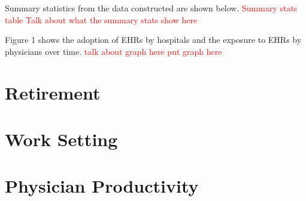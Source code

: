 \documentclass[11pt]{article}
\begin{document}
Summary statistics from the data constructed are shown below. \textcolor{red}{Summary stats table} \textcolor{red}{Talk about what the summary stats show here}

Figure 1 shows the adoption of EHRs by hospitals and the exposure to EHRs by physicians over time. \textcolor{red}{talk about graph here} \textcolor{red}{put graph here}



\section{Retirement}

\section{Work Setting}

\section{Physician Productivity}

\
\end{document}
